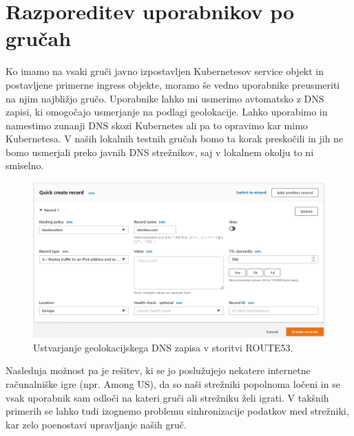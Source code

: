 \documentclass[a4paper, 12pt]{book}
\begin{document}
\section{Razporeditev uporabnikov po gručah}
Ko imamo na vsaki gruči javno izpostavljen Kubernetesov service objekt in postavljene primerne ingress objekte, moramo še vedno uporabnike preusmeriti na njim najbližjo gručo.
Uporabnike lahko mi usmerimo avtomatsko z DNS zapisi, ki omogočajo usmerjanje na podlagi geolokacije.
Lahko uporabimo in namestimo zunanji DNS skozi Kubernetes ali pa to opravimo kar mimo Kubernetesa.
V naših lokalnih testnih gručah bomo ta korak preskočili in jih ne bomo usmerjali preko javnih DNS strežnikov, saj v lokalnem okolju to ni smiselno.
\begin{figure}[h]
\begin{center}
\includegraphics[width=1.0\textwidth]{images/geolokacijski-dns.png}
\end{center}
\caption{Ustvarjanje geolokacijskega DNS zapisa v storitvi ROUTE53.}
\label{primer-ustvarjanje-geolokacijskega-zapisa}
\end{figure}

Naslednja možnost pa je rešitev, ki se jo poslužujejo nekatere internetne računalniške igre (npr. Among US), da so naši strežniki popolnoma ločeni in se vsak uporabnik sam odloči na kateri gruči ali strežniku želi igrati.
V takšnih primerih se lahko tudi izognemo problemu sinhronizacije podatkov med strežniki, kar zelo poenostavi upravljanje naših gruč.
\end{document}
